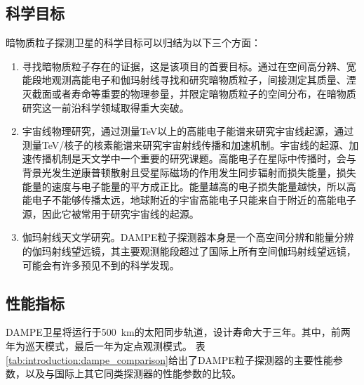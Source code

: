 \subsection{科学目标}
暗物质粒子探测卫星的科学目标可以归结为以下三个方面：
\begin{enumerate}
	\item 寻找暗物质粒子存在的证据，这是该项目的首要目标。通过在空间高分辨、宽能段地观测高能电子和伽玛射线寻找和研究暗物质粒子，间接测定其质量、湮灭截面或者寿命等重要的物理参量，并限定暗物质粒子的空间分布，在暗物质研究这一前沿科学领域取得重大突破。
	\item 宇宙线物理研究，通过测量TeV以上的高能电子能谱来研究宇宙线起源，通过测量TeV/核子的核素能谱来研究宇宙射线传播和加速机制。宇宙线的起源、加速传播机制是天文学中一个重要的研究课题。高能电子在星际中传播时，会与背景光发生逆康普顿散射且受星际磁场的作用发生同步辐射而损失能量，损失能量的速度与电子能量的平方成正比。能量越高的电子损失能量越快，所以高能电子不能够传播太远，地球附近的宇宙高能电子只能来自于附近的高能电子源，因此它被常用于研究宇宙线的起源。
	\item 伽玛射线天文学研究。DAMPE粒子探测器本身是一个高空间分辨和能量分辨的伽玛射线望远镜，其主要观测能段超过了国际上所有空间伽玛射线望远镜，可能会有许多预见不到的科学发现。
\end{enumerate}

    
\subsection{性能指标}
DAMPE卫星将运行于\SI{500}{\kilo\meter}的太阳同步轨道，设计寿命大于三年。其中，前两年为巡天模式，最后一年为定点观测模式。
表\ref{tab:introduction:dampe_comparison}给出了DAMPE粒子探测器的主要性能参数，以及与国际上其它同类探测器的性能参数的比较。

